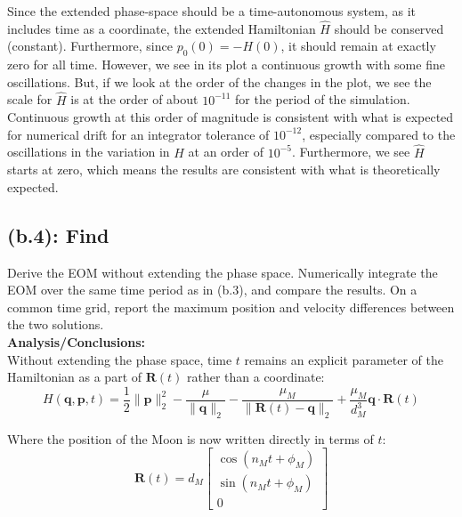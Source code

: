 \documentclass[titlepage]{article}
\begin{document}
\begin{mdframed}[linewidth=1pt, innertopmargin=10pt, innerbottommargin=10pt]
	Since the extended phase-space should be a time-autonomous system, as it includes time as a coordinate, the extended Hamiltonian $\widehat{H}$ should be conserved (constant). Furthermore, since $p_0(0)=-H(0)$, it should remain at exactly zero for all time. However, we see in its plot a continuous growth with some fine oscillations. But, if we look at the order of the changes in the plot, we see the scale for $\widehat{H}$ is at the order of about $10^{-11}$ for the period of the simulation. Continuous growth at this order of magnitude is consistent with what is expected for numerical drift for an integrator tolerance of $10^{-12}$, especially compared to the oscillations in the variation in $H$ at an order of $10^{-5}$. Furthermore, we see $\widehat{H}$ starts at zero, which means the results are consistent with what is theoretically expected.
\end{mdframed}

\subsection*{(b.4): Find}

Derive the EOM without extending the phase space. Numerically integrate the EOM over the same time period as in (b.3), and compare the results. On a common time grid, report the maximum position and velocity differences between the two solutions. \\

\textbf{Analysis/Conclusions:}\\

Without extending the phase space, time $t$ remains an explicit parameter of the Hamiltonian as a part of $\boldsymbol{R}(t)$ rather than a coordinate:
\begin{equation}
	H(\boldsymbol{q},\boldsymbol{p},t)=\frac{1}{2}\|\boldsymbol{p}\|_2^2-\frac{\mu}{\|\boldsymbol{q}\|_2}-\frac{\mu_M}{\|\boldsymbol{R}(t)-\boldsymbol{q}\|_2}+\frac{\mu_M}{d_M^3}\boldsymbol{q}\cdot\boldsymbol{R}(t)
\end{equation}

Where the position of the Moon is now written directly in terms of $t$:
\begin{equation}
	\boldsymbol{R}(t)=d_M
	\begin{bmatrix}
		\cos(n_Mt+\phi_M) \\
		\sin(n_Mt+\phi_M) \\
		0
	\end{bmatrix}
\end{equation}
\end{document}
